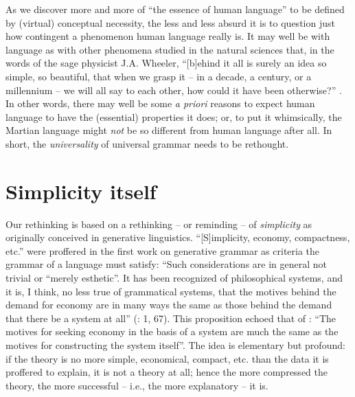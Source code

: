 \documentclass[output=paper]{langsci/langscibook}
\begin{document}
As we discover more and more of “the essence of human language” to be defined
by (virtual) conceptual necessity, the less and less absurd it is to question
just how contingent a phenomenon human language really is. It may well be with
language as with other phenomena studied in the natural sciences that, in the
words of the sage physicist J.A. Wheeler, “[b]ehind it all is surely an idea so
simple, so beautiful, that when we grasp it – in a decade, a century, or a
millennium – we will all say to each other, how could it have been otherwise?”
\citep[386]{Wheeler1986}. In other words, there may well be some \emph{a
priori} reasons to expect human language to have the (essential) properties it
does; or, to put it whimsically, the Martian language might \emph{not} be so
different from human language after all. In short, the \emph{universality} of
universal grammar needs to be rethought.

\section{Simplicity itself}

Our rethinking is based on a rethinking – or reminding – of \emph{simplicity}
as originally conceived in generative linguistics. “[S]implicity, economy,
compactness, etc.” were proffered in the first work on generative grammar as
criteria the grammar of a language must satisfy: “Such considerations are in
general not trivial or \enquote{merely esthetic}. It has been recognized of
philosophical systems, and it is, I think, no less true of grammatical systems,
that the motives behind the demand for economy are in many ways the same as
those behind the demand that there be a system at all” (\citealt{Chomsky1951}:
1, 67). This proposition echoed that of \citet[107]{Goodman1943}: “The motives
for seeking economy in the basis of a system are much the same as the motives
for constructing the system itself”. The idea is elementary but profound: if
the theory is no more simple, economical, compact, etc. than the data it is
proffered to explain, it is not a theory at all; hence the more compressed the
theory, the more successful – i.e., the more explanatory – it is.
\end{document}
